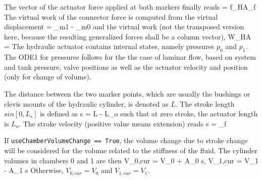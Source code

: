     The vector of the actuator force applied at both markers finally reads
    \be
      \fv = f_{HA}\vv_{f}
    \ee
    The virtual work of the connector force is computed from the virtual displacement 
    \be
      \delta \Delta\!  = \delta {}_{m1} - \delta {}_{m0} \eqComma
    \ee
    and the virtual work (not the transposed version here, because the resulting generalized forces shall be a column vector),
    \be
      \delta W_{HA} = \fv \delta \Delta\!  
      \eqDot
    \ee    
    The hydraulic actuator contains internal states, namely pressures $p_0$ and $p_1$.
    The \ac{ODE1} for pressures follows for the the case of laminar flow, based on system and tank pressure,
    valve positions as well as the actuator velocity and position (only for change of volume).
    
    The distance between the two marker points, which are usually the bushings or clevis mounts of the hydraulic cylinder, is
    denoted as $L$. The stroke length $s in [0, L_s]$ is defined as
    \be
      s = L - L_o
    \ee
    such that at zero stroke, the actuator length is $L_o$. The stroke velocity (positive value means extension) reads
    \be
      \dot s = \Delta\!  \vv_{f}
    \ee
    
    If \texttt{useChamberVolumeChange == True}, the volume change due to stroke change will be considered for the
    volume related to the stiffness of the fluid.
    The cylinder volumes in chambers 0 and 1 are then
    \be
      V_{0,cur} = V_0 + A_0 \cdot s, \quad
      V_{1,cur} = V_1 - A_1 \cdot s
    \ee
    Otherwise, $V_{0,cur}=V_0$ and $V_{1,cur}=V_1$.
    
